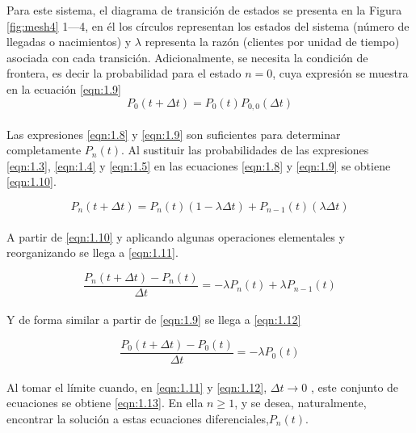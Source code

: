 Para este sistema, el diagrama de transición de estados se presenta en la Figura \ref{fig:mesh4} 1—4, en él los
círculos representan los estados del sistema (número de llegadas o nacimientos) y $ \lambda $ representa la
razón (clientes por unidad de tiempo) asociada con cada transición. Adicionalmente, se necesita la condición de frontera, es decir la probabilidad para el estado $ n = 0 $, cuya expresión se muestra en la ecuación \ref{eqn:1.9}
\\
\begin{equation}
    P_{0}\left ( t+ \Delta t \right )=P_{0}\left ( t \right )P_{0,0}\left ( \Delta t \right )
    \label{eqn:1.9}
\end{equation}
\\
Las expresiones \ref{eqn:1.8} y \ref{eqn:1.9} son suficientes para determinar completamente $ P_{n} \left ( t \right ) $. Al sustituir las probabilidades de las expresiones \ref{eqn:1.3}, \ref{eqn:1.4} y \ref{eqn:1.5} en las ecuaciones \ref{eqn:1.8} y \ref{eqn:1.9} se obtiene \ref{eqn:1.10}.

\begin{equation}
    P_{n}\left ( t+\Delta t \right )=P_{n}\left ( t \right )\left ( 1-\lambda \Delta t \right )+P_{n-1}\left ( t \right )\left ( \lambda \Delta t \right )
    \label{eqn:1.10}
\end{equation}
\\
A partir de \ref{eqn:1.10} y aplicando algunas operaciones elementales y reorganizando se llega a \ref{eqn:1.11}.

\begin{equation}
    \frac{P_{n}\left ( t+\Delta t \right ) - P_{n}\left ( t \right ) }{\Delta t}=-\lambda P_{n}\left ( t \right )+\lambda P_{n-1}\left ( t \right )    
    \label{eqn:1.11}
\end{equation}
\\
Y de forma similar a partir de \ref{eqn:1.9} se llega a \ref{eqn:1.12} 

\begin{equation}
    \frac{P_{0}\left ( t+\Delta t \right ) - P_{0}\left ( t \right ) }{\Delta t}=-\lambda P_{0}\left ( t \right )
    \label{eqn:1.12}
\end{equation}
\\
Al tomar el límite cuando, en \ref{eqn:1.11} y \ref{eqn:1.12}, $ \Delta t \rightarrow 0 $ , este conjunto de ecuaciones se obtiene \ref{eqn:1.13}. En ella $ n\geq 1 $, y se desea, naturalmente, encontrar la solución a estas ecuaciones diferenciales,$ P_{n}\left ( t \right ) $.

